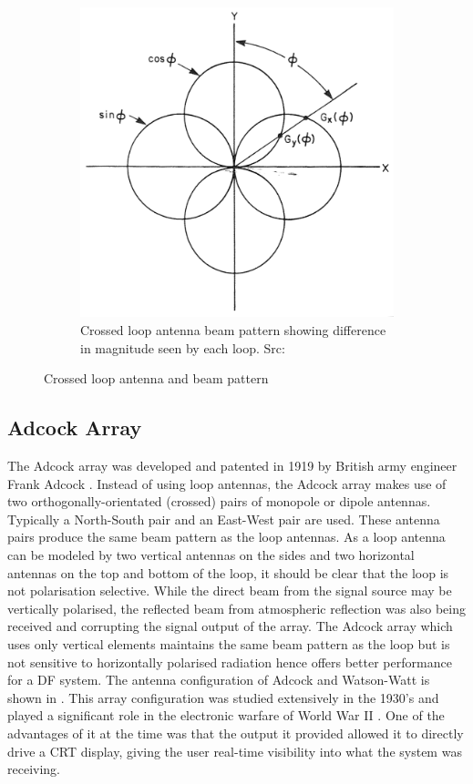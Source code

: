 \begin{figure}
\begin{subfigure}[b]{0.4\textwidth}
    \includegraphics[width=\textwidth]{./img/lit_review/loop_antenna_crossed_beam}
    \caption{Crossed loop antenna beam pattern showing difference in magnitude seen by each loop. Src: \cite{jenkins1991smallaperture}}
  \end{subfigure}
  \caption{Crossed loop antenna and beam pattern}
  \label{fig:lit_crossed_loop_antenna}
\end{figure}

\subsection{Adcock Array}
The Adcock array was developed and patented in 1919 by British army engineer Frank Adcock \cite{gething1991radio}.
Instead of using loop antennas, the Adcock array makes use of two orthogonally-orientated (crossed) pairs of monopole or dipole antennas. Typically a North-South pair and an East-West pair are used. These antenna pairs produce the same beam pattern as the loop antennas. 
As a loop antenna can be modeled by two vertical antennas on the sides and two horizontal antennas on the top and bottom of the loop, it should be clear that the loop is not polarisation selective. While the direct beam from the signal source may be vertically polarised, the reflected beam from atmospheric reflection was also being received and corrupting the signal output of the array.
The Adcock array which uses only vertical elements maintains the same beam pattern as the loop but is not sensitive to horizontally polarised radiation hence offers better performance for a DF system.
The antenna configuration of Adcock and Watson-Watt is shown in .
This array configuration was studied extensively in the 1930's and played a significant role in the electronic warfare of World War II \cite{gething1991radio}. One of the advantages of it at the time was that the output it provided allowed it to directly drive a CRT display, giving the user real-time visibility into what the system was receiving\cite{jenkins1991smallaperture}. 

